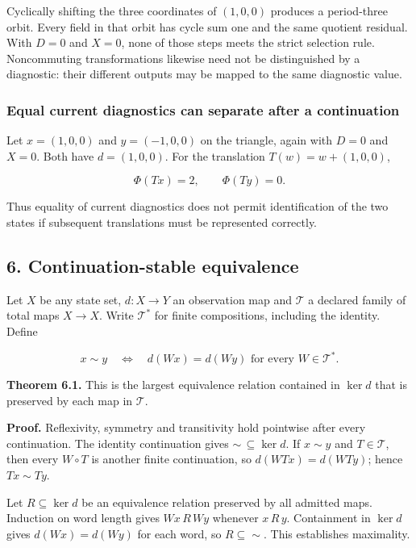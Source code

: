 \documentclass[
]{article}
\begin{document}
Cyclically shifting the three coordinates of \((1,0,0)\) produces a
period-three orbit. Every field in that orbit has cycle sum one and the
same quotient residual. With \(D=0\) and \(X=0\), none of those steps
meets the strict selection rule. Noncommuting transformations likewise
need not be distinguished by a diagnostic: their different outputs may
be mapped to the same diagnostic value.

\subsubsection{Equal current diagnostics can separate after a
continuation}\label{equal-current-diagnostics-can-separate-after-a-continuation}

Let \(x=(1,0,0)\) and \(y=(-1,0,0)\) on the triangle, again with \(D=0\)
and \(X=0\). Both have \(d=(1,0,0)\). For the translation
\(T(w)=w+(1,0,0)\),

\[
\Phi(Tx)=2,\qquad \Phi(Ty)=0.
\]

Thus equality of current diagnostics does not permit identification of
the two states if subsequent translations must be represented correctly.

\subsection{6. Continuation-stable
equivalence}\label{continuation-stable-equivalence}

Let \(X\) be any state set, \(d:X\to Y\) an observation map and
\(\mathcal T\) a declared family of total maps \(X\to X\). Write
\(\mathcal T^*\) for finite compositions, including the identity. Define

\[
x\sim y\quad\Longleftrightarrow\quad
d(Wx)=d(Wy)\text{ for every }W\in\mathcal T^*.
\]

\textbf{Theorem 6.1.} This is the largest equivalence relation contained
in \(\ker d\) that is preserved by each map in \(\mathcal T\).

\textbf{Proof.} Reflexivity, symmetry and transitivity hold pointwise
after every continuation. The identity continuation gives
\(\sim\,\subseteq\ker d\). If \(x\sim y\) and \(T\in\mathcal T\), then
every \(W\circ T\) is another finite continuation, so \(d(WTx)=d(WTy)\);
hence \(Tx\sim Ty\).

Let \(R\subseteq\ker d\) be an equivalence relation preserved by all
admitted maps. Induction on word length gives \(Wx\,R\,Wy\) whenever
\(x\,R\,y\). Containment in \(\ker d\) gives \(d(Wx)=d(Wy)\) for each
word, so \(R\subseteq\sim\). This establishes maximality.
\end{document}
